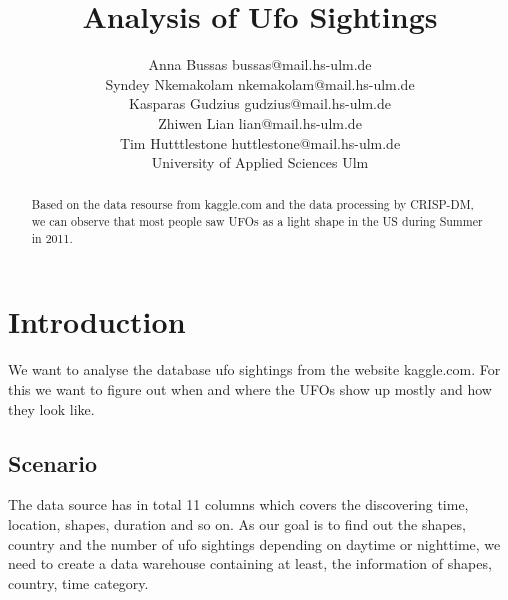 \documentclass[11pt, journal]{IEEEtran}
\begin{document}
%
\title{Analysis of Ufo Sightings}


\author{ \parbox{3 in}{\centering Anna Bussas bussas@mail.hs-ulm.de\\
Syndey Nkemakolam nkemakolam@mail.hs-ulm.de\\
Kasparas Gudzius gudzius@mail.hs-ulm.de\\
Zhiwen Lian lian@mail.hs-ulm.de\\
Tim Hutttlestone huttlestone@mail.hs-ulm.de\\
				 University of Applied Sciences Ulm\\
 }
}






\maketitle

\begin{abstract}
Based on the data resourse from kaggle.com and the data processing by CRISP-DM, we can observe that most people saw UFOs as a light shape in the US during Summer in 2011. 
\end{abstract}


\section{Introduction}
\label{sec:intro}
We want to analyse the database ufo sightings from
the website kaggle.com. For this we want to figure out 
when and where the UFOs show up mostly and how they look like. 
\subsection{Scenario} \label{subsec:scenario}
The data source has in total 11 columns which covers the discovering time, location, shapes, duration and so on. As our goal is to find out the shapes, country and the number of ufo sightings depending on daytime or nighttime, we need to create a data warehouse containing at least, the information of shapes, country, time category.
\end{document}

